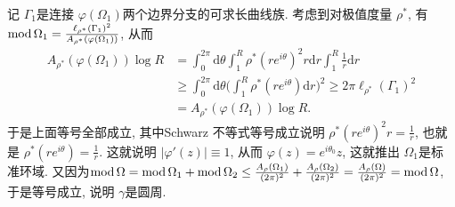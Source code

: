 \begin{itemize}
    记 $\Gamma_1$是连接 $\varphi(\Omega_1)$两个边界分支的可求长曲线族.
    考虑到对极值度量 $\rho^*$, 有 $\operatorname{mod}\Omega_1 
    =\frac{\ell_{\rho^*}(\Gamma_1)^2}{ A_{\rho^*}(\varphi(\Omega_1))}$,
    从而
    \begin{align*}
        A_{\rho^*}(\varphi(\Omega_1)) \log R 
        &= \int_0^{2\pi}\mathrm{d}\theta\int_1^{R}\rho^*(re^{i\theta})^2 r\mathrm{d}r \int_1^R \frac{1}{r}\mathrm{d}r\\
        & \ge \int_0^{2\pi}\mathrm{d}\theta  \bigg(\int_1^{R}\rho^*(re^{i\theta}) \mathrm{d}r\bigg)^2
        \ge 2\pi \ell_{\rho^*}(\Gamma_1)^2\\
        & = A_{\rho^*}(\varphi(\Omega_1)) \log R.
    \end{align*}
    于是上面等号全部成立, 其中Schwarz 不等式等号成立说明 
    $\rho^*(re^{i\theta})^2r = \frac{1}{r}$, 
    也就是 $\rho^*(re^{i\theta}) = \frac{1}{r}$. 
    这就说明 $|\varphi'(z)|\equiv 1$, 从而  $\varphi(z)= e^{i\theta_0}z$, 
    这就推出 $\Omega_1$是标准环域.
    又因为$\operatorname{mod}\Omega = \operatorname{mod}\Omega_1+\operatorname{mod}\Omega_2
    \le \frac{A_\rho(\Omega_1)}{(2\pi)^2}+\frac{A_\rho(\Omega_2)}{(2\pi)^2} 
    = \frac{A_\rho(\Omega)}{(2\pi)^2} = \operatorname{mod}\Omega$, 
    于是等号成立, 说明 $\gamma$是圆周.
\end{itemize}

